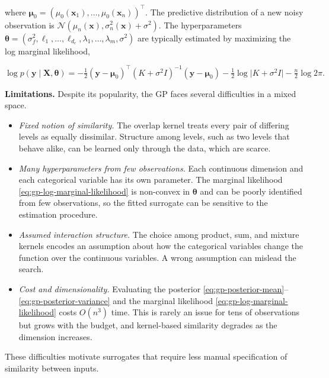 where $\boldsymbol{\mu}_0 = (\mu_0(\boldsymbol{x}_1), \dots, \mu_0(\boldsymbol{x}_n))^\top$. The predictive distribution of a new noisy observation is $\mathcal{N}(\mu_n(\boldsymbol{x}), \sigma_n^2(\boldsymbol{x}) + \sigma^2)$. The hyperparameters $\boldsymbol{\theta} = (\sigma_f^2, \ell_1, \dots, \ell_{d_c}, \lambda_1, \dots, \lambda_m, \sigma^2)$ are typically estimated by maximizing the log marginal likelihood,

\begin{equation}
  \log p(\boldsymbol{y} \mid \boldsymbol{X}, \boldsymbol{\theta}) = -\tfrac{1}{2} (\boldsymbol{y} - \boldsymbol{\mu}_0)^\top (K + \sigma^2 I)^{-1} (\boldsymbol{y} - \boldsymbol{\mu}_0) - \tfrac{1}{2} \log \lvert K + \sigma^2 I \rvert - \tfrac{n}{2} \log 2\pi.
  \label{eq:gp-log-marginal-likelihood}
\end{equation}

\textbf{Limitations.} Despite its popularity, the GP faces several difficulties in a mixed space.

\begin{itemize}
  \item \textit{Fixed notion of similarity.} The overlap kernel treats every pair of differing levels as equally dissimilar. Structure among levels, such as two levels that behave alike, can be learned only through the data, which are scarce.
  \item \textit{Many hyperparameters from few observations.} Each continuous dimension and each categorical variable has its own parameter. The marginal likelihood \eqref{eq:gp-log-marginal-likelihood} is non-convex in $\boldsymbol{\theta}$ and can be poorly identified from few observations, so the fitted surrogate can be sensitive to the estimation procedure.
  \item \textit{Assumed interaction structure.} The choice among product, sum, and mixture kernels encodes an assumption about how the categorical variables change the function over the continuous variables. A wrong assumption can mislead the search.
  \item \textit{Cost and dimensionality.} Evaluating the posterior \eqref{eq:gp-posterior-mean}–\eqref{eq:gp-posterior-variance} and the marginal likelihood \eqref{eq:gp-log-marginal-likelihood} costs $O(n^3)$ time. This is rarely an issue for tens of observations but grows with the budget, and kernel-based similarity degrades as the dimension increases.
\end{itemize}

These difficulties motivate surrogates that require less manual specification of similarity between inputs.

